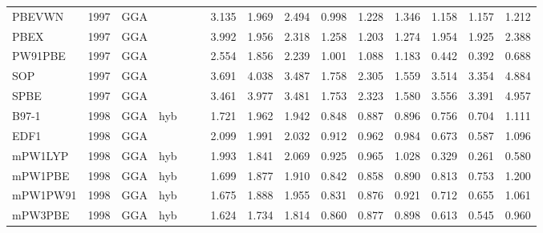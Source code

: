 \begin{landscape}
\begin{longtable}{lcccccrrrrrrrrr}
    PBEVWN           & 1997 & GGA  &          &             &           & 3.135             & 1.969             & 2.494  & 0.998              & 1.228             & 1.346  & 1.158   & 1.157 & 1.212 \\
    PBEX             & 1997 & GGA  &          &             &           & 3.992             & 1.956             & 2.318  & 1.258              & 1.203             & 1.274  & 1.954   & 1.925 & 2.388 \\
    PW91PBE          & 1997 & GGA  &          &             &           & 2.554             & 1.856             & 2.239  & 1.001              & 1.088             & 1.183  & 0.442   & 0.392 & 0.688 \\
    SOP              & 1997 & GGA  &          &             &           & 3.691             & 4.038             & 3.487  & 1.758              & 2.305             & 1.559  & 3.514   & 3.354 & 4.884 \\
    SPBE             & 1997 & GGA  &          &             &           & 3.461             & 3.977             & 3.481  & 1.753              & 2.323             & 1.580  & 3.556   & 3.391 & 4.957 \\
    B97-1            & 1998 & GGA  & hyb      &             &           & 1.721             & 1.962             & 1.942  & 0.848              & 0.887             & 0.896  & 0.756   & 0.704 & 1.111 \\
    EDF1             & 1998 & GGA  &          &             &           & 2.099             & 1.991             & 2.032  & 0.912              & 0.962             & 0.984  & 0.673   & 0.587 & 1.096 \\
    mPW1LYP          & 1998 & GGA  & hyb      &             &           & 1.993             & 1.841             & 2.069  & 0.925              & 0.965             & 1.028  & 0.329   & 0.261 & 0.580 \\
    mPW1PBE          & 1998 & GGA  & hyb      &             &           & 1.699             & 1.877             & 1.910  & 0.842              & 0.858             & 0.890  & 0.813   & 0.753 & 1.200 \\
    mPW1PW91         & 1998 & GGA  & hyb      &             &           & 1.675             & 1.888             & 1.955  & 0.831              & 0.876             & 0.921  & 0.712   & 0.655 & 1.061 \\
    mPW3PBE          & 1998 & GGA  & hyb      &             &           & 1.624             & 1.734             & 1.814  & 0.860              & 0.877             & 0.898  & 0.613   & 0.545 & 0.960 \\

\end{longtable}
\end{landscape}
